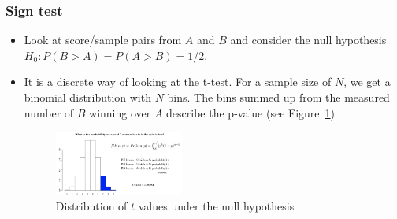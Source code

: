 \subsubsection{Sign test}
\begin{itemize}
	\item Look at score/sample pairs from $A$ and $B$ and consider the null hypothesis $H_0: P(B>A)=P(A>B)=1/2$.
	\item It is a discrete way of looking at the t-test. For a sample size of $N$, we get a binomial distribution with $N$ bins. The bins summed up from the measured number of $B$ winning over $A$ describe the p-value (see Figure~\ref{img:hypothesis_testing_sign_test})
	\begin{figure}[ht]
		\centering
		\includegraphics[width=0.4\textwidth]{figures/hypothesis_testing_sign_test.png}
		\caption{Distribution of $t$ values under the null hypothesis}
		\label{img:hypothesis_testing_sign_test}
	\end{figure}
\end{itemize}
